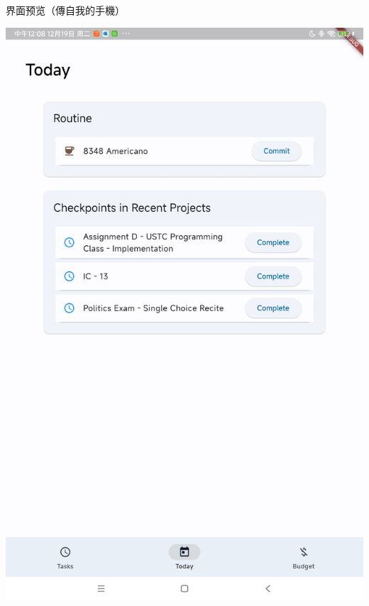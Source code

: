 \documentclass{beamer}
\begin{document}
    \begin{frame}
        \sectionpage
    \end{frame}
    \begin{frame}{界面预览（傳自我的手機）}
        \begin{center}
            \begin{minipage}[l]{.45\textwidth}
                \includegraphics[width=.85\textwidth]{page-today.jpg}
            \end{minipage}
            \begin{minipage}[r]{.45\textwidth}

\end{minipage}
\end{center}
\end{frame}
\end{document}
